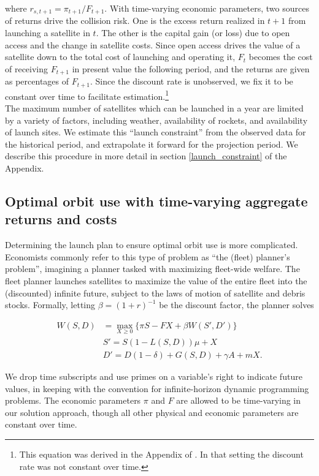 \documentclass[12pt]{article}
\begin{document}
where $r_{s,t+1} = \pi_{t+1}/F_{t+1}$. With time-varying economic parameters, two sources of returns drive the collision risk. One is the excess return realized in $t+1$ from launching a satellite in $t$. The other is the capital gain (or loss) due to open access and the change in satellite costs. Since open access drives the value of a satellite down to the total cost of launching and operating it, $F_t$ becomes the cost of receiving $F_{t+1}$ in present value the following period, and the returns are given as percentages of $F_{t+1}$. Since the discount rate is unobserved, we fix it to be constant over time to facilitate estimation.\footnote{This equation was derived in the Appendix of \cite{raorondinaWP}. In that setting the discount rate was not constant over time.} \\

The maximum number of satellites which can be launched in a year are limited by a variety of factors, including weather, availability of rockets, and availability of launch sites. We estimate this ``launch constraint'' from the observed data for the historical period, and extrapolate it forward for the projection period. We describe this procedure in more detail in section \ref{launch_constraint} of the Appendix.

\subsection{Optimal orbit use with time-varying aggregate returns and costs}

Determining the launch plan to ensure optimal orbit use is more complicated. Economists commonly refer to this type of problem as ``the (fleet) planner's problem'', imagining a planner tasked with maximizing fleet-wide welfare. The fleet planner launches satellites to maximize the value of the entire fleet into the (discounted) infinite future, subject to the laws of motion of satellite and debris stocks. Formally, letting $\beta = (1+r)^{-1}$ be the discount factor, the planner solves

\begin{align}
\label{plannersProblem}
W(S,D) &= \max_{X \geq 0} \{ \pi S - F X + \beta W(S',D') \} \\
& S' = S(1 - L(S,D))\mu + X \nonumber \\
& D' = D(1-\delta) + G(S,D) + \gamma A + m X \nonumber .
\end{align}

We drop time subscripts and use primes on a variable's right to indicate future values, in keeping with the convention for infinite-horizon dynamic programming problems. The economic parameters $\pi$ and $F$ are allowed to be time-varying in our solution approach, though all other physical and economic parameters are constant over time. \\
\end{document}
